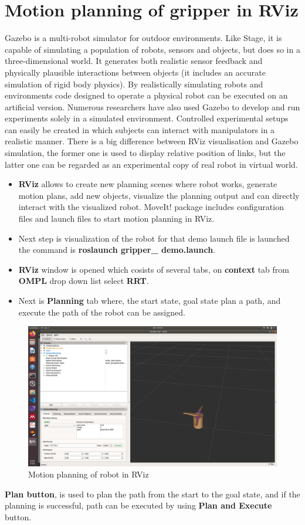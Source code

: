 \documentclass[a4paper,12pt,one side]{report}%
\begin{document}
\section{Motion planning of gripper in RViz}
Gazebo is a multi-robot simulator for outdoor environments.
Like Stage, it is capable of simulating a population of robots, sensors and objects, but does so in a three-dimensional world. It generates both realistic sensor feedback and physically plausible interactions between objects (it includes an accurate simulation of rigid body physics).
By realistically simulating robots and environments code
designed to operate a physical robot can be executed on
an artificial version. Numerous researchers have also used
Gazebo to develop and run experiments solely in a simulated
environment. Controlled experimental setups can easily be
created in which subjects can interact with manipulators in
a realistic manner.
There is a big difference between RViz visualisation and
Gazebo simulation, the former one is used to display relative
position of links, but the latter one can be regarded as an
experimental copy of real robot in virtual world.
\begin{itemize}
    \item \textbf{RViz} allows to create new planning scenes where robot works, generate motion plans, add new objects, visualize the planning output and can directly interact with the visualized robot. 
    MoveIt! package includes configuration files and launch files to start motion planning in RViz.
    \item Next step is visualization of the robot for that demo launch file is launched the command is \textbf{roslaunch gripper\_ demo.launch}.
    \item \textbf{RViz} window is opened which cosists of several tabs, on \textbf{context} tab from \textbf{OMPL} drop down list select \textbf{RRT}.
    \item Next is  \textbf{Planning} tab where, the start state, goal state plan a path, and execute the path of the robot can be assigned. 
    \end{itemize}
    \begin{figure}[!h]
    \centering
    \includegraphics[scale=0.2]{gripper_images/planning_in_RViz.png}
    \caption{Motion planning of robot in RViz}
    \label{moveit_start}
    \end{figure}
    \textbf{Plan button}, is used to plan the path from the start to the goal state, and if the planning is successful, path can be executed by using 
    \textbf{Plan and Execute} button.
\end{document}
